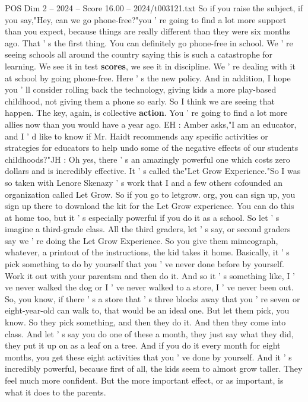 \begin{textsample}{POS Dim 2 – 2024 – Score 16.00 – 2024/t003121.txt}
So if you raise the subject, if you say,"Hey, can we go phone-free?"you ' re going to find a lot more support than you expect, because things are really different than they were six months ago.
That ' s the first thing.
You can definitely go phone-free in school.
We ' re seeing schools all around the country saying this is such a catastrophe for learning.
We see it in test \textbf{scores}, we see it in discipline.
We ' re dealing with it at school by going phone-free.
Here ' s the new policy.
And in addition, I hope you ' ll consider rolling back the technology, giving kids a more play-based childhood, not giving them a phone so early.
So I think we are seeing that happen.
The key, again, is collective \textbf{action}.
You ' re going to find a lot more allies now than you would have a year ago.
EH : Amber asks,"I am an educator, and I ' d like to know if Mr.
Haidt recommends any specific activities or strategies for educators to help undo some of the negative effects of our students childhoods?"JH : Oh yes, there ' s an amazingly powerful one which costs zero dollars and is incredibly effective.
It ' s called the"Let Grow Experience."So I was so taken with Lenore Skenazy ' s work that I and a few others cofounded an organization called Let Grow.
So if you go to letgrow. org, you can sign up, you sign up there to download the kit for the Let Grow experience.
You can do this at home too, but it ' s especially powerful if you do it as a school.
So let ' s imagine a third-grade class.
All the third graders, let ' s say, or second graders say we ' re doing the Let Grow Experience.
So you give them mimeograph, whatever, a printout of the instructions, the kid takes it home.
Basically, it ' s pick something to do by yourself that you ' ve never done before by yourself.
Work it out with your parentsm and then do it.
And so it ' s something like, I ' ve never walked the dog or I ' ve never walked to a store, I ' ve never been out.
So, you know, if there ' s a store that ' s three blocks away that you ' re seven or eight-year-old can walk to, that would be an ideal one.
But let them pick, you know.
So they pick something, and then they do it.
And then they come into class.
And let ' s say you do one of these a month, they just say what they did, they put it up on as a leaf on a tree.
And if you do it every month for eight months, you get these eight activities that you ' ve done by yourself.
And it ' s incredibly powerful, because first of all, the kids seem to almost grow taller.
They feel much more confident.
But the more important effect, or as important, is what it does to the parents.

\end{textsample}
